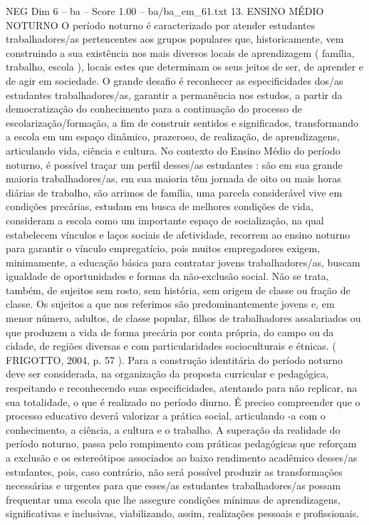 \begin{textsample}{NEG Dim 6 – ba – Score 1.00 – ba/ba\_em\_61.txt}  \label{ex:f6_neg_219}
13.
ENSINO MÉDIO NOTURNO O período noturno é caracterizado por atender estudantes trabalhadores/as pertencentes aos grupos populares que, historicamente, vem construindo a sua existência nos mais diversos locais de aprendizagem ( família, trabalho, escola ), locais estes que determinam os seus jeitos de ser, de aprender e de agir em sociedade.
O grande desafio é reconhecer as especificidades dos/as estudantes trabalhadores/as, garantir a permanência nos estudos, a partir da democratização do conhecimento para a continuação do processo de escolarização/formação, a fim de construir sentidos e significados, transformando a escola em um espaço dinâmico, prazeroso, de realização, de aprendizagens, articulando vida, ciência e cultura.
No contexto do Ensino Médio do período noturno, é possível traçar um perfil desses/as estudantes : são em sua grande maioria trabalhadores/as, em sua maioria têm jornada de oito ou mais horas diárias de trabalho, são arrimos de família, uma parcela considerável vive em condições precárias, estudam em busca de melhores condições de vida, consideram a escola como um importante espaço de socialização, na qual estabelecem vínculos e laços sociais de afetividade, recorrem ao ensino noturno para garantir o vínculo empregatício, pois muitos empregadores exigem, minimamente, a educação básica para contratar jovens trabalhadores/as, buscam igualdade de oportunidades e formas da não-exclusão social.
Não se trata, também, de sujeitos sem rosto, sem história, sem origem de classe ou fração de classe.
Os sujeitos a que nos referimos são predominantemente jovens e, em menor número, adultos, de classe popular, filhos de trabalhadores assalariados ou que produzem a vida de forma precária por conta própria, do campo ou da cidade, de regiões diversas e com particularidades socioculturais e étnicas. ( FRIGOTTO, 2004, p. 57 ).
Para a construção identitária do período noturno deve ser considerada, na organização da proposta curricular e pedagógica, respeitando e reconhecendo suas especificidades, atentando para não replicar, na sua totalidade, o que é realizado no período diurno.
É preciso compreender que o processo educativo deverá valorizar a prática social, articulando -a com o conhecimento, a ciência, a cultura e o trabalho.
A superação da realidade do período noturno, passa pelo rompimento com práticas pedagógicas que reforçam a exclusão e os estereótipos associados ao baixo rendimento acadêmico desses/as estudantes, pois, caso contrário, não será possível produzir as transformações necessárias e urgentes para que esses/as estudantes trabalhadores/as possam frequentar uma escola que lhe assegure condições mínimas de aprendizagens, significativas e inclusivas, viabilizando, assim, realizações pessoais e profissionais.

\end{textsample}
